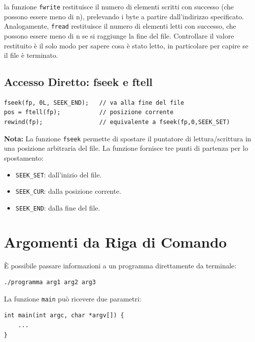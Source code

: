 \documentclass[oneside]{scrbook}
\begin{document}
la funzione \texttt{fwrite} restituisce il numero di elementi scritti con successo (che possono essere meno di n),
prelevando i byte a partire dall'indirizzo specificato.
Analogamente, \texttt{fread} restituisce il numero di elementi letti con successo, che possono
essere meno di n se si raggiunge la fine del file. Controllare il valore restituito è 
il solo modo per sapere cosa è stato letto, in particolare per capire se il file è terminato.



\subsection{Accesso Diretto: fseek e ftell}

\begin{lstlisting}[style=cstyle]
fseek(fp, 0L, SEEK_END);   // va alla fine del file
pos = ftell(fp);           // posizione corrente
rewind(fp);                // equivalente a fseek(fp,0,SEEK_SET)
\end{lstlisting}

\textbf{Nota:} La funzione \texttt{fseek} permette di spostare il puntatore di lettura/scrittura 
in una posizione arbitraria del file. La funzione fornisce tre punti di partenza per lo spostamento:
\begin{itemize}
    \item \texttt{SEEK\_SET}: dall'inizio del file.
    \item \texttt{SEEK\_CUR}: dalla posizione corrente.
    \item \texttt{SEEK\_END}: dalla fine del file.
\end{itemize} 

\section{Argomenti da Riga di Comando}

È possibile passare informazioni a un programma direttamente da terminale:

\begin{lstlisting}[style=cstyle]
./programma arg1 arg2 arg3
\end{lstlisting}

La funzione \texttt{main} può ricevere due parametri:

\begin{lstlisting}[style=cstyle]
int main(int argc, char *argv[]) {
    ...
}
\end{lstlisting}
\end{document}
